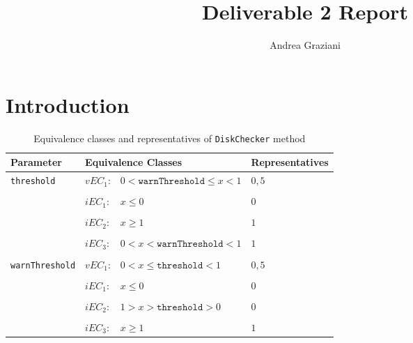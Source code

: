 \documentclass[sigchi]{acmart}
\begin{document}
\title{Deliverable 2 Report}

\author{Andrea Graziani}

\renewcommand{\shortauthors}{Andrea Graziani (0273395)}


\maketitle

\section{Introduction}

\begin{table*}
  \caption{Equivalence classes and representatives of \texttt{DiskChecker} method}
  \label{tab:libraries}
  \begin{tabular}{llp{10cm}p{5cm}}
    \toprule
    \textbf{Parameter} & \multicolumn{2}{|l|}{\textbf{Equivalence Classes}} & \textbf{Representatives} \\
    \midrule
    
	\multirow{3}{*}{\texttt{threshold}} & $vEC_1$: & $0 < \texttt{warnThreshold} \leq x < 1$  & $0,5$ \\    
    
    \\[-1em] 
    & $iEC_1$: & $x \leq 0$ & $0$ \\ 
    
    \\[-1em]
    & $iEC_2$: & $x \geq 1$ & $1$ \\
    
    \\[-1em]
    & $iEC_3$: & $0 < x < \texttt{warnThreshold} < 1$ & $1$ \\
    
    \\[-1em] \hline 
	   
    \multirow{3}{*}{\texttt{warnThreshold}} & $vEC_1$: & $0 < x \leq \texttt{threshold} < 1 $  & $0,5$ \\    
    
    \\[-1em] 
    & $iEC_1$: & $x \leq 0$ & $0$ \\ 
    
	\\[-1em] 
    & $iEC_2$: & $1 > x > \texttt{threshold} > 0$ & $0$ \\  
    
    \\[-1em] 
    & $iEC_3$: & $x \geq 1$ & $1$ \\    
    
    \bottomrule
  \end{tabular}
\end{table*}
\end{document}
